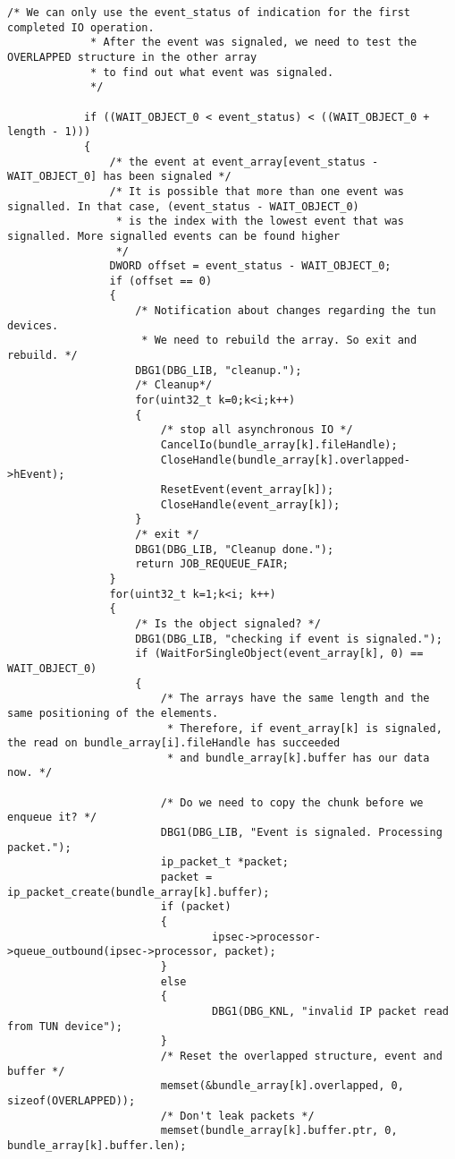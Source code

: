 \begin{lstlisting}[caption=Code für handle\_plain auf Windows]
            /* We can only use the event_status of indication for the first completed IO operation.
             * After the event was signaled, we need to test the OVERLAPPED structure in the other array
             * to find out what event was signaled.
             */

            if ((WAIT_OBJECT_0 < event_status) < ((WAIT_OBJECT_0 + length - 1)))
            {
                /* the event at event_array[event_status - WAIT_OBJECT_0] has been signaled */
                /* It is possible that more than one event was signalled. In that case, (event_status - WAIT_OBJECT_0)
                 * is the index with the lowest event that was signalled. More signalled events can be found higher
                 */
                DWORD offset = event_status - WAIT_OBJECT_0;
                if (offset == 0)
                {
                    /* Notification about changes regarding the tun devices.
                     * We need to rebuild the array. So exit and rebuild. */
                    DBG1(DBG_LIB, "cleanup.");
                    /* Cleanup*/
                    for(uint32_t k=0;k<i;k++)
                    {
                        /* stop all asynchronous IO */
                        CancelIo(bundle_array[k].fileHandle);
                        CloseHandle(bundle_array[k].overlapped->hEvent);
                        ResetEvent(event_array[k]);
                        CloseHandle(event_array[k]);
                    }
                    /* exit */
                    DBG1(DBG_LIB, "Cleanup done.");
                    return JOB_REQUEUE_FAIR;
                }
                for(uint32_t k=1;k<i; k++)
                {
                    /* Is the object signaled? */
                    DBG1(DBG_LIB, "checking if event is signaled.");
                    if (WaitForSingleObject(event_array[k], 0) == WAIT_OBJECT_0)
                    {
                        /* The arrays have the same length and the same positioning of the elements.
                         * Therefore, if event_array[k] is signaled, the read on bundle_array[i].fileHandle has succeeded
                         * and bundle_array[k].buffer has our data now. */

                        /* Do we need to copy the chunk before we enqueue it? */
                        DBG1(DBG_LIB, "Event is signaled. Processing packet.");
                        ip_packet_t *packet;
                        packet = ip_packet_create(bundle_array[k].buffer);
                        if (packet)
                        {
                                ipsec->processor->queue_outbound(ipsec->processor, packet);
                        }
                        else
                        {
                                DBG1(DBG_KNL, "invalid IP packet read from TUN device");
                        }
                        /* Reset the overlapped structure, event and buffer */
                        memset(&bundle_array[k].overlapped, 0, sizeof(OVERLAPPED));
                        /* Don't leak packets */
                        memset(bundle_array[k].buffer.ptr, 0, bundle_array[k].buffer.len);


\end{lstlisting}

